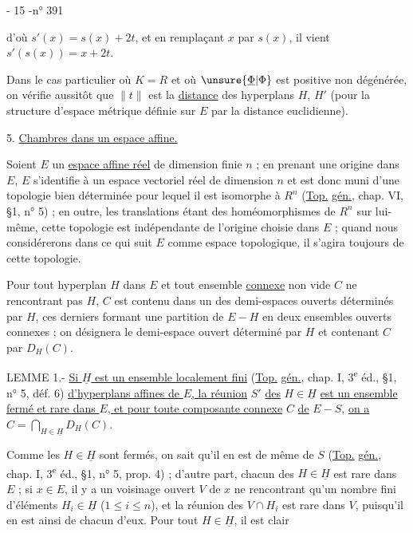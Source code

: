 



- 15 -\hfill n° 391

d'où $s'(x)=s(x)+2t$, et en remplaçant $x$ par $s(x)$, il vient $s'(s(x))=x+2t$.

Dans le cas particulier où $K=R$ et où $\unsure{\underline{\Phi}|\Phi}$ est positive non dégénérée, on vérifie aussitôt que $\|t\|$ est la \uline{distance} des hyperplans $H$, $H'$ (pour la structure d'espace métrique définie sur $E$ par la distance euclidienne).

5. \uline{Chambres dans un espace affine.}

Soient $E$ un \uline{espace affine réel} de dimension finie $n$ ; en prenant une origine dans $E$, $E$ s'identifie à un espace vectoriel réel de dimension $n$ et est donc muni d'une topologie bien déterminée pour lequel il est isomorphe à $R^n$ (\uline{Top.} \uline{gén.}, chap. VI, §1, n° 5) ; en outre, les translations étant des homéomorphismes de $R^n$ sur lui-même, cette topologie est indépendante de l'origine choisie dans $E$ ; quand nous considérerons dans ce qui suit $E$ comme espace topologique, il s'agira toujours de cette topologie.

Pour tout hyperplan $H$ dans $E$ et tout ensemble \uline{connexe} non vide $C$ ne rencontrant pas $H$, $C$ est contenu dans un des demi-espaces ouverts déterminés par $H$, ces derniers formant une partition de $E-H$ en deux ensembles ouverts connexes ; on désignera le demi-espace ouvert déterminé par $H$ et contenant $C$ par $D_H(C)$.

LEMME 1.- \uline{Si $\underline H$ est un ensemble localement fini} (\uline{Top.} \uline{gén.}, chap. I, 3\textsuperscript{e} éd., §1, n° 5, déf. 6) \uline{d'hyperplans affines de $E$, la réunion} $S'$ \uline{des} $H\in\underline H$ \uline{est un ensemble fermé et rare dans $E$, et pour toute composante connexe} $C$ \uline{de} $E-S$, \uline{on a} $C=\bigcap_{H\in\underline H}D_H(C)$.

Comme les $H\in\underline H$ sont fermés, on sait qu'il en est de même de $S$ (\uline{Top.} \uline{gén.}, chap. I, 3\textsuperscript{e} éd., §1, n° 5, prop. 4) ; d'autre part, chacun des $H\in\underline H$ est rare dans $E$ ; si $x\in E$, il y a un voisinage ouvert $V$ de $x$ ne rencontrant qu'un nombre fini d'éléments $H_i\in\underline H$ ($1\leq i\leq n$), et la réunion des $V\cap H_i$ est rare dans $V$, puisqu'il en est ainsi de chacun d'eux. Pour tout $H\in\underline H$, il est clair


